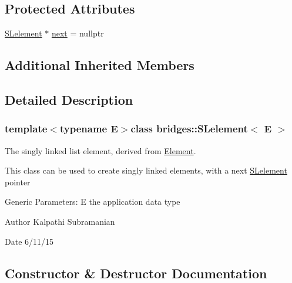 \subsection*{Protected Attributes}
\begin{DoxyCompactItemize}
\item 
\hyperlink{classbridges_1_1_s_lelement}{S\+Lelement} $\ast$ \hyperlink{classbridges_1_1_s_lelement_ad7449d10a09ebc52653a7baed812aa43}{next} = nullptr
\end{DoxyCompactItemize}
\subsection*{Additional Inherited Members}


\subsection{Detailed Description}
\subsubsection*{template$<$typename E$>$class bridges\+::\+S\+Lelement$<$ E $>$}

The singly linked list element, derived from \hyperlink{classbridges_1_1_element}{Element}. 

This class can be used to create singly linked elements, with a next \hyperlink{classbridges_1_1_s_lelement}{S\+Lelement} pointer

Generic Parameters\+: E the application data type

\begin{DoxyAuthor}{Author}
Kalpathi Subramanian 
\end{DoxyAuthor}
\begin{DoxyDate}{Date}
6/11/15 
\end{DoxyDate}


\subsection{Constructor \& Destructor Documentation}
\hypertarget{classbridges_1_1_s_lelement_a9ddac46a935b85cde76305135d16de0a}{}
